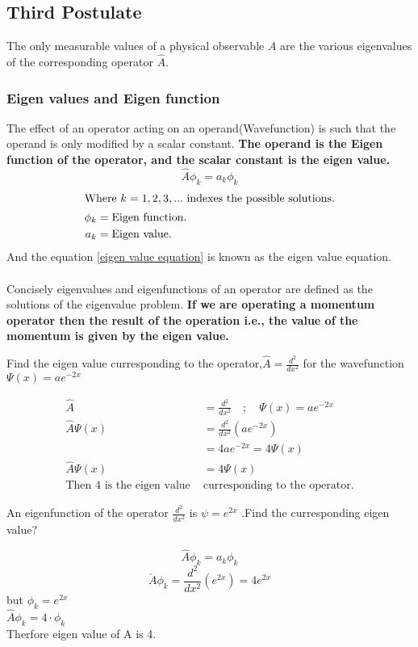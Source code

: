 \subsection{Third Postulate}
The only measurable values of a physical observable ${A}$ are the various eigenvalues of the corresponding operator $\hat{{A}}$.
\subsubsection{Eigen values and Eigen function}
The effect of an operator acting on an operand(Wavefunction) is such that the operand is only modified by a scalar constant.\textbf{ The operand is the Eigen function of the operator,  and the scalar constant is the eigen value.}
\begin{equation}
\hat{A} \phi_{k}=a_{k}\phi_{k} 
\label{eigen value equation}
\end{equation}
\begin{align*}
\intertext{Where $ k = 1, 2,3, . . . $ indexes the possible solutions.}
\phi_{k}&=\text{Eigen function.}\\
a_{k}&=\text{Eigen value.}
\end{align*}
And the equation \ref{eigen value equation} is known as the eigen value equation.\\\\
Concisely eigenvalues and eigenfunctions of an operator are defined as the solutions of the eigenvalue problem.
\textbf{If we are operating a momentum operator then the result of the operation i.e., the value of the momentum is given by the eigen value.}
\begin{exercise}
	Find the eigen value curresponding to the operator,$\hat{A}=\frac{d^{2}}{d x^{2}}$ for the wavefunction $\Psi(x)=a e^{-2 x}$
\end{exercise}
\begin{answer}
	\begin{align*}
	\hat{A}&=\frac{d^{2}}{d x^{2}} \quad;\quad  \Psi(x)=a e^{-2 x}\\
	\hat{A} \Psi(x)&=\frac{d^{2}}{d x^{2}}\left(a e^{-2 x}\right)\\
	&=4 a e^{-2 x}=4 \Psi(x)\\
	\hat{A} \Psi(x)&=4 \Psi(x)\\
	\text{Then 4 is the eigen value }&\text{curresponding to the operator.}
	\end{align*}	
\end{answer}
\begin{exercise}
	An eigenfunction of the operator $\frac{d^2}{dx^2}$ is $\psi=e^{2x}$ .Find the curresponding eigen value?
\end{exercise}
\begin{answer}
$$\hat{{A}}\phi_{k}=a_k\phi_{k}$$
$$\hat{A}\phi_{k}=\frac{d^2}{dx^2}(e^{2x})=4e^{2x}$$
but $\phi_{k}=e^{2x}$\\
$\hat{A}\phi_{k}=4\cdot \phi_{k}$\\
Therfore eigen value of A is 4.	
\end{answer}
